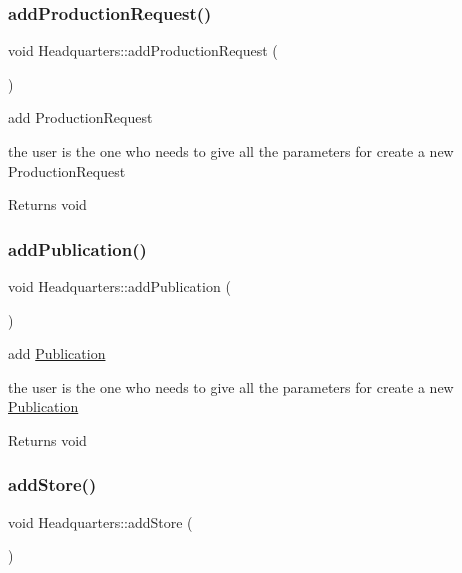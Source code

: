 \subsubsection{\texorpdfstring{add\+Production\+Request()}{addProductionRequest()}}
{\footnotesize\ttfamily void Headquarters\+::add\+Production\+Request (\begin{DoxyParamCaption}{ }\end{DoxyParamCaption})}



add Production\+Request 

the user is the one who needs to give all the parameters for create a new Production\+Request

\begin{DoxyReturn}{Returns}
void 
\end{DoxyReturn}
\mbox{\label{class_headquarters_ad232157623c9d2ada742982f08a82be8}} 
\subsubsection{\texorpdfstring{add\+Publication()}{addPublication()}}
{\footnotesize\ttfamily void Headquarters\+::add\+Publication (\begin{DoxyParamCaption}{ }\end{DoxyParamCaption})}



add \hyperlink{class_publication}{Publication} 

the user is the one who needs to give all the parameters for create a new \hyperlink{class_publication}{Publication}

\begin{DoxyReturn}{Returns}
void 
\end{DoxyReturn}
\mbox{\label{class_headquarters_ab0fa0fad9679f2f99811257d5a49f4c0}} 
\subsubsection{\texorpdfstring{add\+Store()}{addStore()}}
{\footnotesize\ttfamily void Headquarters\+::add\+Store (\begin{DoxyParamCaption}{ }\end{DoxyParamCaption})}



